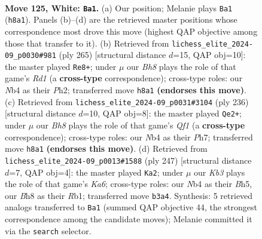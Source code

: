 \documentclass[11pt]{article}
\begin{document}
\clearpage

\begin{figure}[p]\centering
\begin{subfigure}{0.46\textwidth}\centering
\resizebox{\linewidth}{!}{%
\newchessgame
\chessboard[
  setfen={7B/4k3/8/2q5/1N6/1K6/8/8 w - - 18 125},
  showmover=false,
  pgfstyle=straightmove, color=movearrow, markmove={h8-a1}
]}
\caption{}
\end{subfigure}\hfill
\begin{subfigure}{0.46\textwidth}\centering
\resizebox{\linewidth}{!}{%
\newchessgame
\chessboard[
  setfen={3r4/p7/8/8/4K3/6k1/7p/7Q b - - 69 133},
  showmover=false,
  pgfstyle=straightmove, color=movearrow, markmove={d8-e8}
]}
\caption{}
\end{subfigure}
\\[4pt]
\begin{subfigure}{0.46\textwidth}\centering
\resizebox{\linewidth}{!}{%
\newchessgame
\chessboard[
  setfen={7q/K6P/8/8/8/8/1k6/5Q2 w - - 99 119},
  showmover=false,
  pgfstyle=straightmove, color=movearrow, markmove={f1-e2}
]}
\caption{}
\end{subfigure}\hfill
\begin{subfigure}{0.46\textwidth}\centering
\resizebox{\linewidth}{!}{%
\newchessgame
\chessboard[
  setfen={8/8/8/2K4b/8/k3Q3/8/1r6 b - - 85 124},
  showmover=false,
  pgfstyle=straightmove, color=movearrow, markmove={a3-a2}
]}
\caption{}
\end{subfigure}
\caption{\textbf{Move 125, White: \texttt{Ba1}.} (a) Our position; Melanie plays \texttt{Ba1} (\texttt{h8a1}). Panels (b)--(d) are the retrieved master positions whose correspondence most drove this move (highest QAP objective among those that transfer to it). (b) Retrieved from \texttt{lichess\_elite\_2024-09\_p0030\#981} (ply 265) [structural distance $d$=15, QAP obj=10]: the master played \texttt{Re8+}; under $\mu$ our \emph{Bh8} plays the role of that game's \emph{Rd1} (a \textbf{cross-type} correspondence); cross-type roles: our \emph{N}b4 as their \emph{P}h2; transferred move \texttt{h8a1} \textbf{(endorses this move)}. (c) Retrieved from \texttt{lichess\_elite\_2024-09\_p0031\#3104} (ply 236) [structural distance $d$=10, QAP obj=8]: the master played \texttt{Qe2+}; under $\mu$ our \emph{Bh8} plays the role of that game's \emph{Qf1} (a \textbf{cross-type} correspondence); cross-type roles: our \emph{N}b4 as their \emph{P}h7; transferred move \texttt{h8a1} \textbf{(endorses this move)}. (d) Retrieved from \texttt{lichess\_elite\_2024-09\_p0013\#1588} (ply 247) [structural distance $d$=7, QAP obj=4]: the master played \texttt{Ka2}; under $\mu$ our \emph{Kb3} plays the role of that game's \emph{Ka6}; cross-type roles: our \emph{N}b4 as their \emph{B}h5, our \emph{B}h8 as their \emph{R}b1; transferred move \texttt{b3a4}. Synthesis: 5 retrieved analogs transferred to \texttt{Ba1} (summed QAP objective 44, the strongest correspondence among the candidate moves); Melanie committed it via the \texttt{search} selector.}
\label{fig:thought-m248}
\end{figure}
\end{document}
